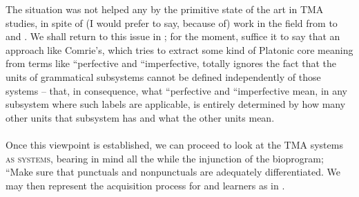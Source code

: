 The situation was not helped any by the primitive state of the art in TMA studies, in spite of (I would prefer to say, because of) work in the field from \citet{Reichenbach1947} to \citet{Comrie1976} and \citet{Woisetschlaeger1977}. We shall return to this issue in ; for the moment, suffice it to say that an approach like Comrie's, which tries to extract some kind of Platonic core meaning from terms like ``perfective and ``imperfective, totally ignores the fact that the units of grammatical subsystems cannot be defined independently of those systems -- that, in consequence, what ``perfective and ``imperfective mean, in any subsystem where such labels are applicable, is entirely determined by how many other units that subsystem has and what the other units mean.\\\\

Once this viewpoint is established, we can proceed to look at the  TMA systems \textsc{as systems}, bearing in mind all the while the injunction of the bioprogram; ``Make sure that punctuals and nonpunctuals are adequately differentiated. We may then represent the acquisition process for  and  learners as in .%

